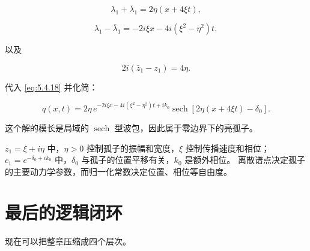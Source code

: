 \documentclass[
    lang=cn,
    scheme=chinese,
    mode=simple,
    device=normal,
    color=blue,
    math=cm,
    thmcnt=section,
    12pt
]{elegantbook}
\begin{document}
\[
    \lambda_1+\bar\lambda_1
    =
    2\eta(x+4\xi t),
\]

\[
    \lambda_1-\bar\lambda_1
    =
    -2i\xi x-4i(\xi^2-\eta^2)t,
\]

以及

\[
    2i(\bar z_1-z_1)=4\eta.
\]

代入 \eqref{eq:5.4.18} 并化简：

\[
    \boxed{
        q(x,t)
        =
        2\eta\,
        e^{-2i\xi x-4i(\xi^2-\eta^2)t+ik_0}
        \operatorname{sech}
        \!\left[
            2\eta(x+4\xi t)-\delta_0
            \right].
    }
\]

这个解的模长是局域的 $\operatorname{sech}$ 型波包，因此属于零边界下的亮孤子。

\begin{callout}[参数的直观意义]
    $z_1=\xi+i\eta$ 中，$\eta>0$ 控制孤子的振幅和宽度，$\xi$ 控制传播速度和相位；$c_1=e^{-\delta_0+ik_0}$ 中，$\delta_0$ 与孤子的位置平移有关，$k_0$ 是额外相位。
    离散谱点决定孤子的主要动力学参数，而归一化常数决定位置、相位等自由度。
\end{callout}

\section*{最后的逻辑闭环}

现在可以把整章压缩成四个层次。
\end{document}
